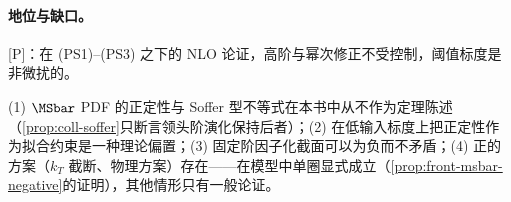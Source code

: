 \paragraph{地位与缺口。}[P]：在 (PS1)--(PS3) 之下的 NLO 论证，高阶与幂次修正不受控制，阈值标度是非微扰的。

\begin{remark}[对本书与拟合的后果]\label{rem:front-positivity-tracks}
(1) $\MSbar$ PDF 的正定性与 Soffer 型不等式在本书中从不作为定理陈述（\cref{prop:coll-soffer}只断言领头阶演化保持后者）；(2) 在低输入标度上把正定性作为拟合约束是一种理论偏置\cite{CollinsRogersSato2022}；(3) 固定阶因子化截面可以为负而不矛盾\cite[附录~A]{CollinsRogersSato2022}；(4) 正的方案（$k_T$ 截断、物理方案）存在——在模型中单圈显式成立（\cref{prop:front-msbar-negative}的证明），其他情形只有一般论证。
\end{remark}
